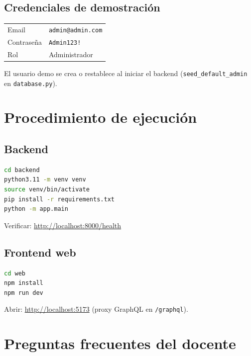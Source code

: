 \documentclass[11pt,a4paper]{article}
\begin{document}
\subsection{Credenciales de demostración}
\begin{center}
  \begin{tabular}{@{}ll@{}}
    \toprule
    Email & \texttt{admin@admin.com} \\
    Contraseña & \texttt{Admin123!} \\
    Rol & Administrador \\
    \bottomrule
  \end{tabular}
\end{center}
El usuario demo se crea o restablece al iniciar el backend (\texttt{seed\_default\_admin} en \texttt{database.py}).

\section{Procedimiento de ejecución}

\subsection{Backend}
\begin{lstlisting}[language=bash]
cd backend
python3.11 -m venv venv
source venv/bin/activate
pip install -r requirements.txt
python -m app.main
\end{lstlisting}
Verificar: \url{http://localhost:8000/health}

\subsection{Frontend web}
\begin{lstlisting}[language=bash]
cd web
npm install
npm run dev
\end{lstlisting}
Abrir: \url{http://localhost:5173} (proxy GraphQL en \texttt{/graphql}).

\section{Preguntas frecuentes del docente}
\end{document}

